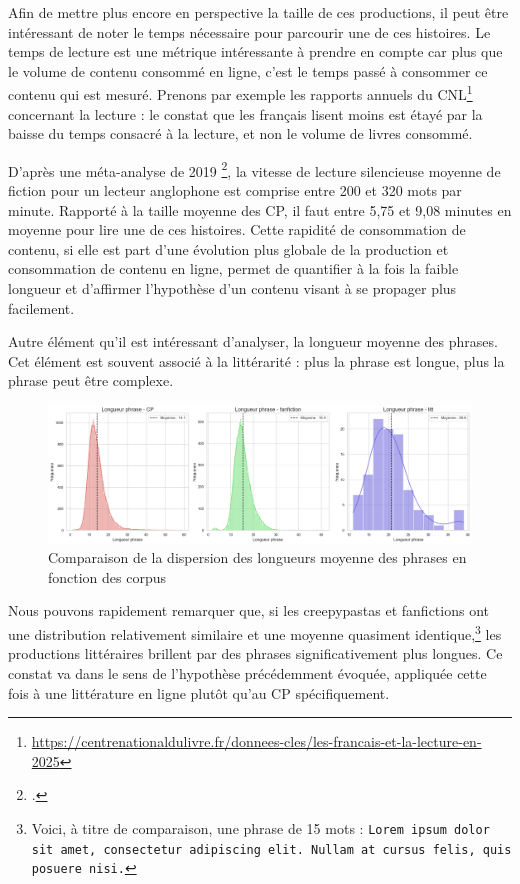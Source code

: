 \documentclass[12pt,a4paper,oneside,titlepage]{book} %
\begin{document}
Afin de mettre plus encore en perspective la taille de ces productions, il peut être intéressant de noter le temps nécessaire pour parcourir une de ces histoires. Le temps de lecture est une métrique intéressante à prendre en compte car plus que le volume de contenu consommé en ligne, c'est le temps passé à consommer ce contenu qui est mesuré. Prenons par exemple les rapports annuels du CNL\footnote{\url{https://centrenationaldulivre.fr/donnees-cles/les-francais-et-la-lecture-en-2025}} concernant la lecture :  le constat que les français lisent moins est étayé par la baisse du temps consacré à la lecture, et non le volume de livres consommé. 

D'après une méta-analyse de 2019 \footcite{BRYSBAERT2019104047}, la vitesse de lecture silencieuse moyenne de fiction pour un lecteur anglophone est comprise entre 200 et 320 mots par minute. 
Rapporté à la taille moyenne des CP, il faut entre 5,75 et 9,08 minutes en moyenne pour lire une de ces histoires. 
Cette rapidité de consommation de contenu, si elle est part d'une évolution plus globale de la production et consommation de contenu en ligne, permet de quantifier à la fois la faible longueur et d'affirmer l'hypothèse d'un contenu visant à se propager plus facilement. 


Autre élément qu'il est intéressant d'analyser, la longueur moyenne des phrases. Cet élément est souvent associé à la littérarité : plus la phrase est longue, plus la phrase peut être complexe. 

    \begin{figure}[htbp]
    \centering
    \includegraphics[width = \textwidth]{illustration/longueur_phrase_comparaison_sans_abberantes.png.png}
    \caption{Comparaison de la dispersion des longueurs moyenne des phrases en fonction des corpus}
\end{figure}
	
Nous pouvons rapidement remarquer que, si les creepypastas et fanfictions ont une distribution relativement similaire et une moyenne quasiment identique,\footnote{Voici, à titre de comparaison, une phrase de 15 mots : \texttt{Lorem ipsum dolor sit amet, consectetur adipiscing elit. Nullam at cursus felis, quis posuere nisi.}} les productions littéraires brillent par des phrases significativement plus longues. Ce constat va dans le sens de l'hypothèse précédemment évoquée, appliquée cette fois à une littérature en ligne plutôt qu'au CP spécifiquement.
\end{document}
